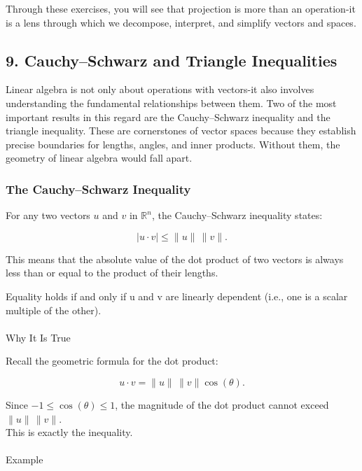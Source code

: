 \documentclass[
  letterpaper,
  DIV=11,
  numbers=noendperiod]{scrreprt}
\makeatletter
\let\oldparagraph\paragraph
\renewcommand{\paragraph}{
    \@ifstar
      \xxxParagraphStar
      \xxxParagraphNoStar
  }
\newcommand{\xxxParagraphStar}[1]{\oldparagraph*{#1}\mbox{}}
\newcommand{\xxxParagraphNoStar}[1]{\oldparagraph{#1}\mbox{}}
\makeatother
\begin{document}
Through these exercises, you will see that projection is more than an
operation-it is a lens through which we decompose, interpret, and
simplify vectors and spaces.

\subsection{9. Cauchy--Schwarz and Triangle
Inequalities}\label{cauchyschwarz-and-triangle-inequalities}

Linear algebra is not only about operations with vectors-it also
involves understanding the fundamental relationships between them. Two
of the most important results in this regard are the Cauchy--Schwarz
inequality and the triangle inequality. These are cornerstones of vector
spaces because they establish precise boundaries for lengths, angles,
and inner products. Without them, the geometry of linear algebra would
fall apart.

\subsubsection{The Cauchy--Schwarz
Inequality}\label{the-cauchyschwarz-inequality}

For any two vectors \(u\) and \(v\) in \(\mathbb{R}^n\), the
Cauchy--Schwarz inequality states:

\[
|u \cdot v| \leq \|u\| \, \|v\|.
\]

This means that the absolute value of the dot product of two vectors is
always less than or equal to the product of their lengths.

Equality holds if and only if u and v are linearly dependent (i.e., one
is a scalar multiple of the other).

\paragraph{Why It Is True}\label{why-it-is-true}

Recall the geometric formula for the dot product:

\[
u \cdot v = \|u\| \, \|v\| \cos(\theta).
\]

Since \(-1 \leq \cos(\theta) \leq 1\), the magnitude of the dot product
cannot exceed \(\|u\| \, \|v\|\).\\
This is exactly the inequality.

\paragraph{Example}\label{example}
\end{document}
